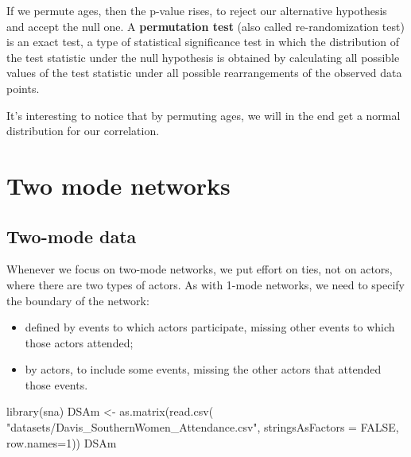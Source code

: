 \documentclass[
  notitlepage,
  onecolumn,
  openany]{book}
\newenvironment{Shaded}{\begin{snugshade}}{\end{snugshade}}
\newcommand{\AttributeTok}[1]{\textcolor[rgb]{0.77,0.63,0.00}{#1}}
\newcommand{\ConstantTok}[1]{\textcolor[rgb]{0.00,0.00,0.00}{#1}}
\newcommand{\DecValTok}[1]{\textcolor[rgb]{0.00,0.00,0.81}{#1}}
\newcommand{\FunctionTok}[1]{\textcolor[rgb]{0.00,0.00,0.00}{#1}}
\newcommand{\NormalTok}[1]{#1}
\newcommand{\OtherTok}[1]{\textcolor[rgb]{0.56,0.35,0.01}{#1}}
\newcommand{\StringTok}[1]{\textcolor[rgb]{0.31,0.60,0.02}{#1}}
\providecommand{\tightlist}{%
  \setlength{\itemsep}{0pt}\setlength{\parskip}{0pt}}
\begin{document}
If we permute ages, then the p-value rises, to reject our alternative hypothesis and accept the null one. A \textbf{permutation test} (also called re-randomization test) is an exact test, a type of statistical significance test in which the distribution of the test statistic under the null hypothesis is obtained by calculating all possible values of the test statistic under all possible rearrangements of the observed data points.

It's interesting to notice that by permuting ages, we will in the end get a normal distribution for our correlation.

\hypertarget{two-mode-networks}{%
\chapter{Two mode networks}\label{two-mode-networks}}

\hypertarget{two-mode-data}{%
\section{Two-mode data}\label{two-mode-data}}

Whenever we focus on two-mode networks, we put effort on ties, not on actors, where there are two types of actors. As with 1-mode networks, we need to specify the boundary of the network:

\begin{itemize}
\tightlist
\item
  defined by events to which actors participate, missing other events to which those actors attended;
\item
  by actors, to include some events, missing the other actors that attended those events.
\end{itemize}

\begin{Shaded}
\begin{Highlighting}[]
\FunctionTok{library}\NormalTok{(sna)}
\NormalTok{DSAm }\OtherTok{\textless{}{-}} \FunctionTok{as.matrix}\NormalTok{(}\FunctionTok{read.csv}\NormalTok{(}
  \StringTok{"datasets/Davis\_SouthernWomen\_Attendance.csv"}\NormalTok{,}
  \AttributeTok{stringsAsFactors =} \ConstantTok{FALSE}\NormalTok{, }\AttributeTok{row.names=}\DecValTok{1}\NormalTok{))}
\NormalTok{DSAm}
\end{Highlighting}
\end{Shaded}
\end{document}
